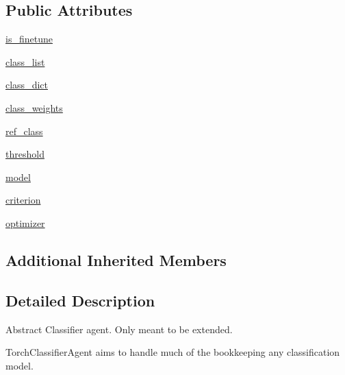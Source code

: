 \subsection*{Public Attributes}
\begin{DoxyCompactItemize}
\item 
\hyperlink{classparlai_1_1core_1_1torch__classifier__agent_1_1TorchClassifierAgent_a9d5bac9fe43ddf4129d486e3061a7a69}{is\+\_\+finetune}
\item 
\hyperlink{classparlai_1_1core_1_1torch__classifier__agent_1_1TorchClassifierAgent_a98e1aad7d454f0ef1a971b60db1bcd18}{class\+\_\+list}
\item 
\hyperlink{classparlai_1_1core_1_1torch__classifier__agent_1_1TorchClassifierAgent_a80b1b3e0162c2dca36a1e1763cf3cad9}{class\+\_\+dict}
\item 
\hyperlink{classparlai_1_1core_1_1torch__classifier__agent_1_1TorchClassifierAgent_ac4c098a9fe13fcbb279cb388059fbdb7}{class\+\_\+weights}
\item 
\hyperlink{classparlai_1_1core_1_1torch__classifier__agent_1_1TorchClassifierAgent_a830ed9662779e824cc9596695b04e985}{ref\+\_\+class}
\item 
\hyperlink{classparlai_1_1core_1_1torch__classifier__agent_1_1TorchClassifierAgent_aba6e1d0ef53762f5930c271c3ae8d63a}{threshold}
\item 
\hyperlink{classparlai_1_1core_1_1torch__classifier__agent_1_1TorchClassifierAgent_acf08c5622edd3627fbe993730f16baa4}{model}
\item 
\hyperlink{classparlai_1_1core_1_1torch__classifier__agent_1_1TorchClassifierAgent_aa59eee6c442bfb02846661fba0904a3d}{criterion}
\item 
\hyperlink{classparlai_1_1core_1_1torch__classifier__agent_1_1TorchClassifierAgent_af7bc3e7b011e16ae3e75617c4773a1a4}{optimizer}
\end{DoxyCompactItemize}
\subsection*{Additional Inherited Members}


\subsection{Detailed Description}
\begin{DoxyVerb}Abstract Classifier agent. Only meant to be extended.

TorchClassifierAgent aims to handle much of the bookkeeping any classification
model.
\end{DoxyVerb}
 

